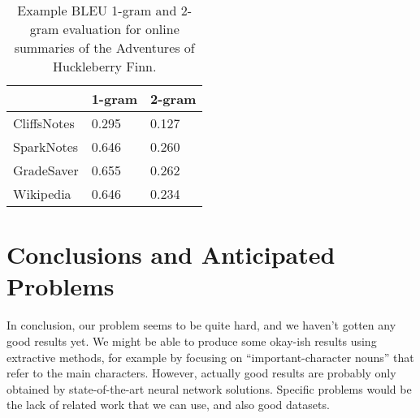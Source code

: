 \begin{table}[hbt]
	\centering
	\caption{Example BLEU 1-gram and 2-gram evaluation for online summaries of the Adventures of Huckleberry Finn.}\label{table:bleu_huckfinn}
	\begin{tabular}{l l l }
		\toprule
		\textbf{}   & \textbf{1-gram} & \textbf{2-gram} \\ \midrule
		CliffsNotes & 0.295           & 0.127           \\ \midrule
		SparkNotes  & 0.646           & 0.260           \\ \midrule
		GradeSaver  & 0.655           & 0.262           \\ \midrule
		Wikipedia   & 0.646           & 0.234           \\
		\bottomrule
	\end{tabular}
\end{table}


\section{Conclusions and Anticipated Problems}
In conclusion, our problem seems to be quite hard, and we haven't gotten any
good results yet. We might be able to produce some okay-ish results using
extractive methods, for example by focusing on ``important-character nouns''
that refer to the main characters. However, actually good results are probably
only obtained by state-of-the-art neural network solutions. Specific problems
would be the lack of related work that we can use, and also good datasets.

